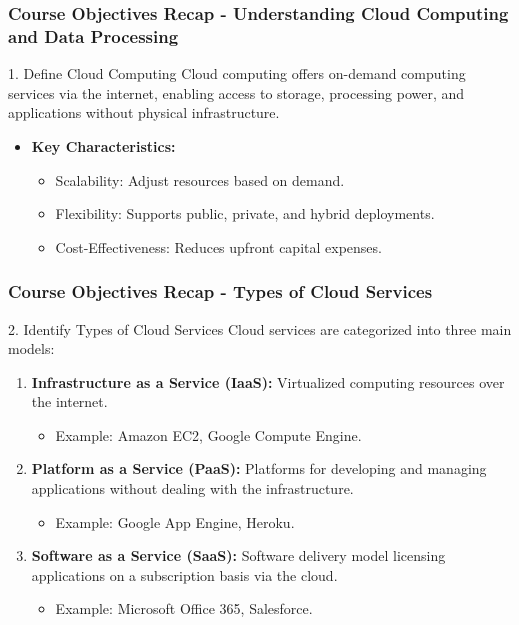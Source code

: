 \documentclass[aspectratio=169]{beamer}
\begin{document}
\begin{frame}[fragile]
    \frametitle{Course Objectives Recap - Understanding Cloud Computing and Data Processing}
    
    \begin{block}{1. Define Cloud Computing}
        Cloud computing offers on-demand computing services via the internet, enabling access to storage, processing power, and applications without physical infrastructure.
    \end{block}
    
    \begin{itemize}
        \item \textbf{Key Characteristics:}
        \begin{itemize}
            \item Scalability: Adjust resources based on demand.
            \item Flexibility: Supports public, private, and hybrid deployments.
            \item Cost-Effectiveness: Reduces upfront capital expenses.
        \end{itemize}
    \end{itemize}
\end{frame}

\begin{frame}[fragile]
    \frametitle{Course Objectives Recap - Types of Cloud Services}
    
    \begin{block}{2. Identify Types of Cloud Services}
        Cloud services are categorized into three main models:
    \end{block}
    
    \begin{enumerate}
        \item \textbf{Infrastructure as a Service (IaaS):} Virtualized computing resources over the internet.
        \begin{itemize}
            \item Example: Amazon EC2, Google Compute Engine.
        \end{itemize}
        
        \item \textbf{Platform as a Service (PaaS):} Platforms for developing and managing applications without dealing with the infrastructure.
        \begin{itemize}
            \item Example: Google App Engine, Heroku.
        \end{itemize}
        
        \item \textbf{Software as a Service (SaaS):} Software delivery model licensing applications on a subscription basis via the cloud.
        \begin{itemize}
            \item Example: Microsoft Office 365, Salesforce.
        \end{itemize}
    \end{enumerate}
\end{frame}
\end{document}
